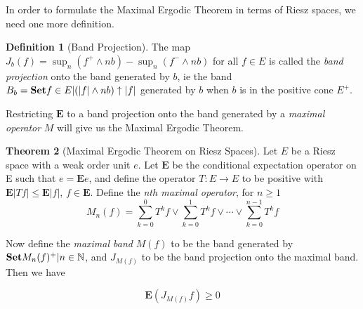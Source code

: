 \documentclass[letterpaper,10pt,oneside,onecolumn,reqno]{amsart}
\newcommand{\NN}{\mathbb N}
\theoremstyle{definition}
\newtheorem{thm}{Theorem}
\newtheorem{defn}[thm]{Definition}
\newcommand{\catname}[1]{{\normalfont\textbf{#1}}}
\newcommand{\Set}{\catname{Set}}
\newcommand{\meet}{\wedge}
\newcommand{\join}{\vee}
\begin{document}
In order to formulate the Maximal Ergodic Theorem in terms of Riesz spaces, we need one more definition. 

\begin{defn}[Band Projection]\label{def:19}
The map $J_b(f) = \sup_n (f^+ \meet nb) - \sup_n(f^- \meet nb)$ for all $f \in E$ is called the \emph{band projection} onto the band generated by $b$, ie the band $B_b = \Set{f \in E | (|f| \meet nb) \uparrow |f|}$ generated by $b$ when $b$ is in the positive cone $E^+$. 
\end{defn}

Restricting $\mathbf{E}$ to a band projection onto the band generated by a \emph{maximal operator} $M$ will give us the Maximal Ergodic Theorem.

\begin{thm}[Maximal Ergodic Theorem on Riesz Spaces]
\label{thr:1}
Let $E$ be a Riesz space with a weak order unit $e$. Let $\mathbf{E}$ be the conditional expectation operator on E such that $e = \mathbf{E}e$, and define the operator $T : E \to E$ to be positive with $\mathbf{E}|Tf| \leq \mathbf{E}|f|$, $f \in \mathbf{E}$. Define the \emph{nth maximal operator}, for $n \geq 1$
\begin{equation}\label{eq:2}
M_n(f) = \sum\limits_{k=0}^{0} T^kf \join \sum\limits_{k=0}^{1} T^kf \join \cdots \join \sum\limits_{k=0}^{n-1} T^kf
\end{equation}

Now define the \emph{maximal band} $M(f)$ to be the band generated by $\Set{M_n(f)^+ | n \in \NN}$, and $J_{M(f)}$ to be the band projection onto the maximal band. Then we have

\begin{equation}\label{eq:3}
\mathbf{E}(J_{M(f)}f) \geq 0
\end{equation}
\end{thm}
\end{document}

